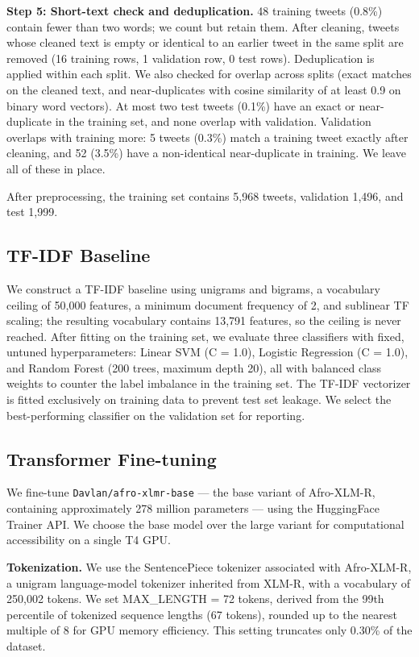 \textbf{Step 5: Short-text check and deduplication.} 48 training tweets (0.8\%) contain fewer than two words; we count but retain them. After cleaning, tweets whose cleaned text is empty or identical to an earlier tweet in the same split are removed (16 training rows, 1 validation row, 0 test rows). Deduplication is applied within each split. We also checked for overlap across splits (exact matches on the cleaned text, and near-duplicates with cosine similarity of at least 0.9 on binary word vectors). At most two test tweets (0.1\%) have an exact or near-duplicate in the training set, and none overlap with validation. Validation overlaps with training more: 5 tweets (0.3\%) match a training tweet exactly after cleaning, and 52 (3.5\%) have a non-identical near-duplicate in training. We leave all of these in place.

After preprocessing, the training set contains 5,968 tweets, validation 1,496, and test 1,999.

\subsection{TF-IDF Baseline}

We construct a TF-IDF baseline using unigrams and bigrams, a vocabulary ceiling of 50,000 features, a minimum document frequency of 2, and sublinear TF scaling; the resulting vocabulary contains 13,791 features, so the ceiling is never reached. After fitting on the training set, we evaluate three classifiers with fixed, untuned hyperparameters: Linear SVM (C = 1.0), Logistic Regression (C = 1.0), and Random Forest (200 trees, maximum depth 20), all with balanced class weights to counter the label imbalance in the training set. The TF-IDF vectorizer is fitted exclusively on training data to prevent test set leakage. We select the best-performing classifier on the validation set for reporting.

\subsection{Transformer Fine-tuning}

We fine-tune \texttt{Davlan/afro-xlmr-base} --- the base variant of Afro-XLM-R, containing approximately 278 million parameters --- using the HuggingFace Trainer API. We choose the base model over the large variant for computational accessibility on a single T4 GPU.

\textbf{Tokenization.} We use the SentencePiece tokenizer associated with Afro-XLM-R, a unigram language-model tokenizer \citep{kudo-richardson-2018-sentencepiece} inherited from XLM-R, with a vocabulary of 250,002 tokens. We set MAX\_LENGTH = 72 tokens, derived from the 99th percentile of tokenized sequence lengths (67 tokens), rounded up to the nearest multiple of 8 for GPU memory efficiency. This setting truncates only 0.30\% of the dataset.

